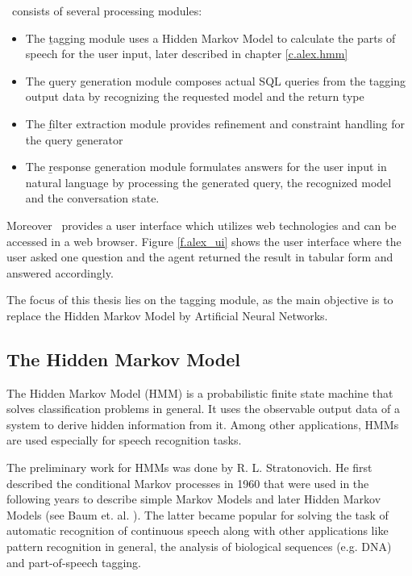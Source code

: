 \Alex\ consists of several processing modules:

\begin{itemize}
	\item The \b{tagging module} uses a Hidden Markov Model to calculate the parts of speech for the user input, later described in chapter \ref{c.alex.hmm}
	\item The \b{query generation module} composes actual SQL queries from the tagging output data by recognizing the requested model and the return type
	\item The \b{filter extraction module} provides refinement and constraint handling for the query generator
	\item The \b{response generation module} formulates answers for the user input in natural language by processing the generated query, the recognized model and the conversation state.
\end{itemize}

Moreover \Alex\ provides a user interface which utilizes web technologies and can be accessed in a web browser. Figure \ref{f.alex_ui} shows the user interface where the user asked one question and the agent returned the result in tabular form and answered accordingly.

The focus of this thesis lies on the tagging module, as the main objective is to replace the Hidden Markov Model by Artificial Neural Networks.

\subsection{The Hidden Markov Model}\label{c.introduction.related.hmm}
The Hidden Markov Model (HMM) is a probabilistic finite state machine that solves classification problems in general. It uses the observable output data of a system to derive hidden information from it. Among other applications, HMMs are used especially for speech recognition tasks.

The preliminary work for HMMs was done by R. L. Stratonovich. He first described the conditional Markov processes in 1960 \cite{stratonovich1960} that were used in the following years to describe simple Markov Models and later Hidden Markov Models (see Baum et. al. \cite{baum1966}\cite{baum1967}). The latter became popular for solving the task of automatic recognition of continuous speech \cite{baker1975} along with other applications like pattern recognition in general, the analysis of biological sequences (e.g. DNA) \cite{bishop1986} and part-of-speech tagging.

